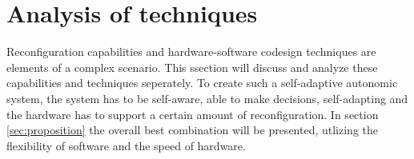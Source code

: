 \section{Analysis of techniques}
\label{sec:technique}
Reconfiguration capabilities and hardware-software codesign techniques are elements of a complex scenario. This ssection will discuss and analyze these capabilities and techniques seperately. To create such a self-adaptive autonomic system, the system has to be self-aware, able to make decisions, self-adapting and the hardware has to support a certain amount of reconfiguration. In section \ref{sec:proposition} the overall best combination will be presented, utlizing the flexibility of software and the speed of hardware.








